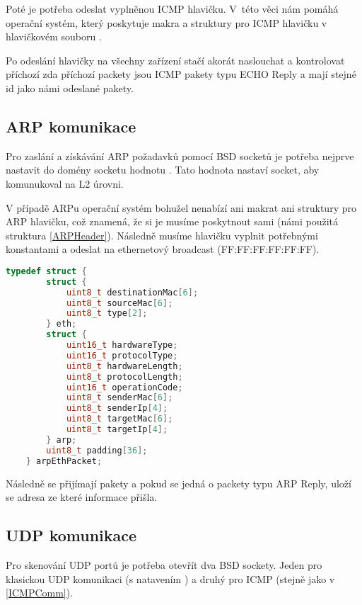 \documentclass[../projekt.tex]{subfiles}
\begin{document}
Poté je potřeba odeslat vyplněnou ICMP hlavičku. V~této věci nám pomáhá operační systém, který poskytuje makra a struktury pro ICMP hlavičku v~ hlavičkovém souboru . 

Po odeslání hlavičky na všechny zařízení stačí akorát naslouchat a kontrolovat příchozí zda příchozí packety jsou ICMP pakety typu ECHO Reply a mají stejné id jako námi odeslané pakety.

\subsection{ARP komunikace}\label{ARPComm}

Pro zaslání a získávání ARP požadavků pomocí BSD socketů je potřeba nejprve nastavit do domény socketu hodnotu . Tato hodnota nastaví socket, aby komunukoval na L2 úrovni. 

V případě ARPu operační systém bohužel nenabízí ani makrat ani struktury pro ARP hlavičku, což znamená, že si je musíme poskytnout sami (námi použitá struktura \autoref{ARPHeader}). Následně musíme hlavičku vyplnit potřebnými konstantami a odeslat na ethernetový broadcast (FF:FF:FF:FF:FF:FF).

\begin{lstlisting}[language=c, label=ARPHeader, caption= Struktura reprezentující ethernet a ARP hlavičku.]
    typedef struct {
        struct {	                
            uint8_t destinationMac[6];
            uint8_t sourceMac[6];
            uint8_t type[2];
        } eth;
        struct {
            uint16_t hardwareType;
            uint16_t protocolType;
            uint8_t hardwareLength;
            uint8_t protocolLength;
            uint16_t operationCode;
            uint8_t senderMac[6];
            uint8_t senderIp[4];
            uint8_t targetMac[6];
            uint8_t targetIp[4];
        } arp;
        uint8_t padding[36];
    } arpEthPacket;
\end{lstlisting}

Následně se přijímají pakety a pokud se jedná o packety typu ARP Reply, uloží se adresa ze které informace přišla.

\subsection{UDP komunikace}\label{UDPComm}

Pro skenování UDP portů je potřeba otevřít dva BSD sockety. Jeden pro klasickou UDP komunikaci (s natavením ) a druhý pro ICMP (stejně jako v \autoref{ICMPComm}).
\end{document}
